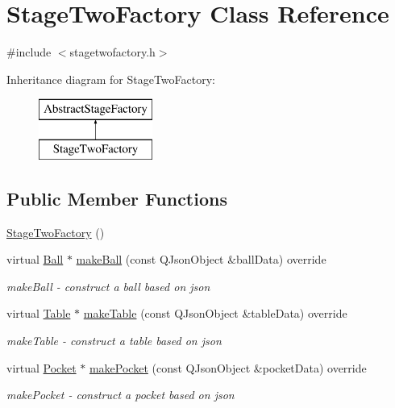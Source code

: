 \hypertarget{class_stage_two_factory}{}\section{Stage\+Two\+Factory Class Reference}
\label{class_stage_two_factory}


{\ttfamily \#include $<$stagetwofactory.\+h$>$}

Inheritance diagram for Stage\+Two\+Factory\+:\begin{figure}[H]
\begin{center}
\leavevmode
\includegraphics[height=2.000000cm]{class_stage_two_factory}
\end{center}
\end{figure}
\subsection*{Public Member Functions}
\begin{DoxyCompactItemize}
\item 
\mbox{\hyperlink{class_stage_two_factory_acac1c74cee2fc4a3fea6b59dc60cb0eb}{Stage\+Two\+Factory}} ()
\item 
virtual \mbox{\hyperlink{class_ball}{Ball}} $\ast$ \mbox{\hyperlink{class_stage_two_factory_aa12e02122eea28b08b3e148521bc2055}{make\+Ball}} (const Q\+Json\+Object \&ball\+Data) override
\begin{DoxyCompactList}\small\item\em make\+Ball -\/ construct a ball based on json \end{DoxyCompactList}\item 
virtual \mbox{\hyperlink{class_table}{Table}} $\ast$ \mbox{\hyperlink{class_stage_two_factory_aa532818e02bed0ea1f5c79a1a1487e71}{make\+Table}} (const Q\+Json\+Object \&table\+Data) override
\begin{DoxyCompactList}\small\item\em make\+Table -\/ construct a table based on json \end{DoxyCompactList}\item 
virtual \mbox{\hyperlink{class_pocket}{Pocket}} $\ast$ \mbox{\hyperlink{class_stage_two_factory_a6b66c413691103cf5df2840bcdb683ef}{make\+Pocket}} (const Q\+Json\+Object \&pocket\+Data) override
\begin{DoxyCompactList}\small\item\em make\+Pocket -\/ construct a pocket based on json \end{DoxyCompactList}\end{DoxyCompactItemize}


